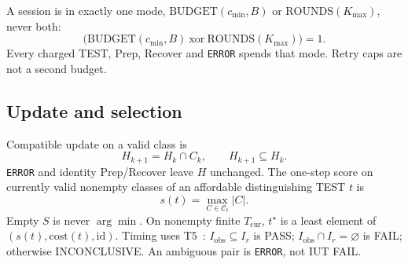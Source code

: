 \begin{assumption}
\label{ass:budget}
A session is in exactly one mode, \(\mathrm{BUDGET}(c_{\min},B)\) or
\(\mathrm{ROUNDS}(K_{\max})\), never both:
\begin{equation}
\label{eq:budget}
\bigl(\mathrm{BUDGET}(c_{\min},B)\ \mathrm{xor}\ \mathrm{ROUNDS}(K_{\max})\bigr)=1.
\end{equation}
Every charged TEST, Prep, Recover and \texttt{ERROR} spends that mode. Retry
caps are not a second budget.
\end{assumption}

\subsection{Update and selection}

Compatible update on a valid class is
\begin{equation}
\label{eq:update}
H_{k+1}=H_k\cap C_k,\qquad H_{k+1}\subseteq H_k.
\end{equation}
\texttt{ERROR} and identity Prep/Recover leave \(H\) unchanged. The one-step
score on currently valid nonempty classes of an affordable distinguishing
TEST \(t\) is
\begin{equation}
\label{eq:score}
s(t)=\max_{C\in\mathcal{C}_t}\lvert C\rvert.
\end{equation}
Empty \(S\) is never \(\arg\min\). On nonempty finite \(T_{\mathrm{cur}}\),
\(t^{\star}\) is a least element of \((s(t),\mathrm{cost}(t),\mathrm{id})\).
Timing uses T5~\cite{jcgm106}: \(I_{\mathrm{obs}}\subseteq I_r\) is PASS;
\(I_{\mathrm{obs}}\cap I_r=\varnothing\) is FAIL; otherwise INCONCLUSIVE. An
ambiguous pair is \texttt{ERROR}, not IUT FAIL.

